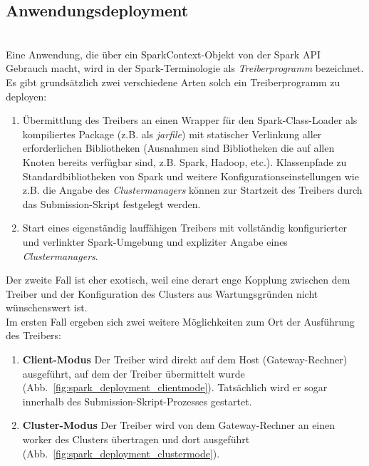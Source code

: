 \subsection{Anwendungsdeployment}\\

Eine Anwendung, die über ein SparkContext-Objekt von der Spark API Gebrauch macht, wird in der Spark-Terminologie als \textit{Treiberprogramm} bezeichnet. \\

Es gibt grundsätzlich zwei verschiedene Arten solch ein Treiberprogramm zu deployen:\\

\begin{enumerate}
	\item Übermittlung des Treibers an einen Wrapper für den Spark-Class-Loader als kompiliertes Package (z.B. als \textit{jarfile}) mit statischer Verlinkung aller erforderlichen Bibliotheken (Ausnahmen sind Bibliotheken die auf allen Knoten bereits verfügbar sind, z.B. Spark, Hadoop, etc.). Klassenpfade zu Standardbibliotheken von Spark und weitere Konfigurationseinstellungen wie z.B. die Angabe des \textit{Clustermanagers} können zur Startzeit des Treibers durch das Submission-Skript festgelegt werden.
	\item Start eines eigenständig lauffähigen Treibers mit vollständig konfigurierter und verlinkter Spark-Umgebung und expliziter Angabe eines \textit{Clustermanagers}.
\end{enumerate}

Der zweite Fall ist eher exotisch, weil eine derart enge Kopplung zwischen dem Treiber und der Konfiguration des Clusters aus Wartungsgründen nicht wünschenswert ist.\\

Im ersten Fall ergeben sich zwei weitere Möglichkeiten zum Ort der Ausführung des Treibers:\\

\begin{enumerate}
	\item \textbf{Client-Modus}
	Der Treiber wird direkt auf dem Host (Gateway-Rechner) ausgeführt, auf dem der Treiber übermittelt wurde (Abb.~\ref{fig:spark_deployment_clientmode}). Tatsächlich wird er sogar innerhalb des Submission-Skript-Prozesses gestartet.
	\item \textbf{Cluster-Modus}
	Der Treiber wird von dem Gateway-Rechner an einen \gls{worker} des Clusters übertragen und dort ausgeführt (Abb.~\ref{fig:spark_deployment_clustermode}).
\end{enumerate}\\

